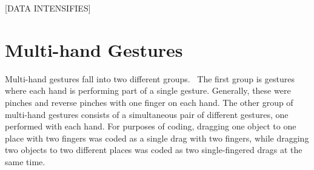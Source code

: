 %
%
%
%
%

[DATA INTENSIFIES]

\section{Multi-hand Gestures}

Multi-hand gestures fall into two different groups. \
The first group is gestures where each hand is performing part of a single gesture.
Generally, these were pinches and reverse pinches with one finger on each hand. 
The other group of multi-hand gestures consists of a simultaneous pair of different gestures, one performed with each hand. 
For purposes of coding, dragging one object to one place with two fingers was coded as a single drag with two fingers, while dragging two objects to two different places was coded as two single-fingered drags at the same time. 


